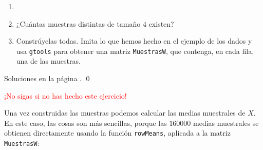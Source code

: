 \documentclass[10pt,a4paper]{article}\usepackage[]{graphicx}\usepackage[]{color}
\newcounter {cont01}
\begin{document}
\begin{ejercicio}
\label{tut06:ejercicio03}
\begin{enumerate}
  \item[]
  \item ¿Cuántas muestras distintas de tamaño $4$ existen?
  \item Constrúyelas todas. Imita lo que hemos hecho en el ejemplo de los dados y usa {\tt gtools} para obtener una matriz {\tt MuestrasW}, que contenga, en cada fila, una de las muestras.
\end{enumerate}
Soluciones en la página \pageref{tut06:ejercicio03:sol}.
\qed
\end{ejercicio}
\textcolor{red}{\Large ¡No sigas si no has hecho este ejercicio!}

Una vez construidas las muestras podemos calcular las medias muestrales de $X$. En este caso, las cosas son más sencillas, porque las $160000$ medias muestrales se obtienen directamente usando la función {\tt rowMeans}, aplicada a la
matriz {\tt MuestrasW}:
\end{document}
